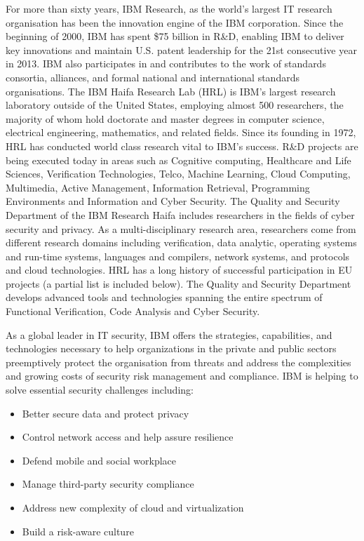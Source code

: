 \documentclass[a4paper,11pt]{article}
\begin{document}
\vspace{0.5cm}

For more than sixty years, IBM Research, as the world's largest IT research organisation has been the innovation engine of the IBM corporation. Since the beginning of 2000, IBM has spent \$75 billion in R\&D, enabling IBM to deliver key innovations and maintain U.S. patent leadership for the 21st consecutive
year in 2013.
IBM also participates in and contributes to the work of standards consortia, alliances, and formal national and international standards organisations. 
The IBM Haifa Research Lab (HRL) is IBM's largest research laboratory outside of the United States, 
employing almost 500 researchers, the majority of whom hold doctorate and master degrees in computer science, electrical engineering, mathematics, and related fields. Since its founding in 1972, HRL has conducted world class research vital to IBM's success. R\&D projects are being executed today in areas such as Cognitive computing, Healthcare and Life Sciences, Verification Technologies, Telco, Machine Learning, Cloud Computing, Multimedia, Active Management, Information Retrieval, Programming Environments and Information and Cyber Security. The Quality and Security Department of the IBM Research Haifa includes researchers in the fields of cyber security and privacy. As a multi-disciplinary research area, researchers come from different research domains including verification, data analytic, operating systems and run-time systems, languages and compilers, network systems, and protocols and cloud technologies.
HRL has a long history of successful participation in EU projects (a partial list is included below). 
%
The Quality and Security Department develops advanced tools and technologies spanning the entire spectrum of Functional Verification, Code Analysis and Cyber Security.

As a global leader in IT security, IBM offers the strategies, capabilities, and technologies necessary to help organizations in the private and public sectors preemptively protect the organisation from threats and address the complexities and growing costs of security risk management and compliance. IBM is helping to solve essential security challenges including:
\begin{itemize}
\item Better secure data and protect privacy
\item Control network access and help assure resilience
\item Defend mobile and social workplace
\item Manage third-party security compliance
\item Address new complexity of cloud and virtualization
\item Build a risk-aware culture
\end{itemize} 	
\end{document}
